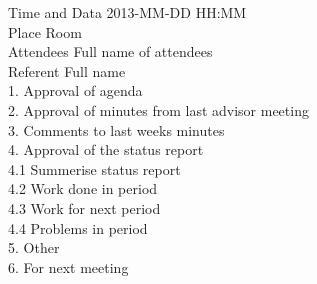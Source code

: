 Time and Data 	2013-MM-DD HH:MM \\
Place 			Room \\
Attendees  		Full name of attendees \\
Referent 		Full name \\

1. Approval of agenda \\
2. Approval of minutes from last advisor meeting \\
3. Comments to last weeks minutes \\
4. Approval of the status report \\
4.1 Summerise status report \\
4.2 Work done in period \\
4.3 Work for next period \\
4.4 Problems in period \\
5. Other \\
6. For next meeting \\
 

\iffalse
\section{Agenda for customer meeting}

\begin{center}
Agenda for customer meeting \#X\\*
2013-MM-DD\\*
\end{center}

\begin{table}[H]
\begin{center}
\begin{tabular}{ l | l }
Time and Data & 2013-MM-DD HH:MM \\
Place & Room \\
Attendees & Full name \\
Referent & Full name \\
\end{tabular}
\end{center}
\caption{Activity chart}
\label{table:activityChartCustomerAgenda}
\end{table}


1. Approval of agenda \\
2. Approval of minutes from last customer meeting \\
3. Comments to last weeks minutes \\
4. Scenario \\
5. Decisions \\
6. Other \\
7. For next meeting \\
\fi

